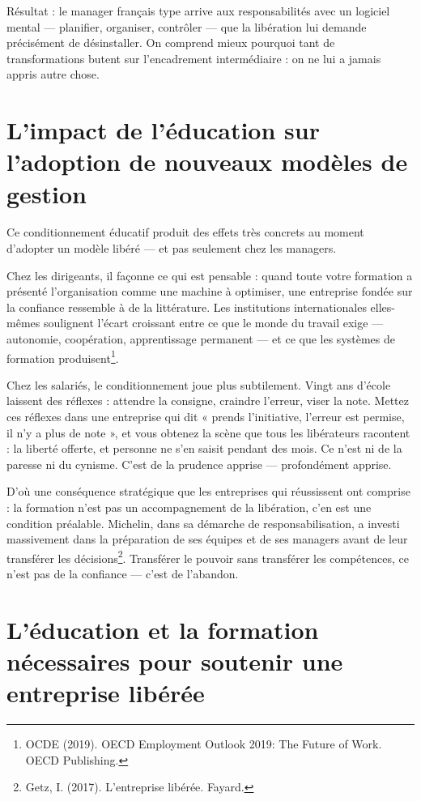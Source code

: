 Résultat : le manager français type arrive aux responsabilités avec un logiciel mental — planifier, organiser, contrôler — que la libération lui demande précisément de désinstaller. On comprend mieux pourquoi tant de transformations butent sur l'encadrement intermédiaire : on ne lui a jamais appris autre chose.

\section{L'impact de l'éducation sur l'adoption de nouveaux modèles de gestion}

Ce conditionnement éducatif produit des effets très concrets au moment d'adopter un modèle libéré — et pas seulement chez les managers.

Chez les dirigeants, il façonne ce qui est pensable : quand toute votre formation a présenté l'organisation comme une machine à optimiser, une entreprise fondée sur la confiance ressemble à de la littérature. Les institutions internationales elles-mêmes soulignent l'écart croissant entre ce que le monde du travail exige — autonomie, coopération, apprentissage permanent — et ce que les systèmes de formation produisent\footnote{OCDE (2019). OECD Employment Outlook 2019: The Future of Work. OECD Publishing.}.

Chez les salariés, le conditionnement joue plus subtilement. Vingt ans d'école laissent des réflexes : attendre la consigne, craindre l'erreur, viser la note. Mettez ces réflexes dans une entreprise qui dit « prends l'initiative, l'erreur est permise, il n'y a plus de note », et vous obtenez la scène que tous les libérateurs racontent : la liberté offerte, et personne ne s'en saisit pendant des mois. Ce n'est ni de la paresse ni du cynisme. C'est de la prudence apprise — profondément apprise.

D'où une conséquence stratégique que les entreprises qui réussissent ont comprise : la formation n'est pas un accompagnement de la libération, c'en est une condition préalable. Michelin, dans sa démarche de responsabilisation, a investi massivement dans la préparation de ses équipes et de ses managers avant de leur transférer les décisions\footnote{Getz, I. (2017). L'entreprise libérée. Fayard.}. Transférer le pouvoir sans transférer les compétences, ce n'est pas de la confiance — c'est de l'abandon.

\section{L'éducation et la formation nécessaires pour soutenir une entreprise libérée}

